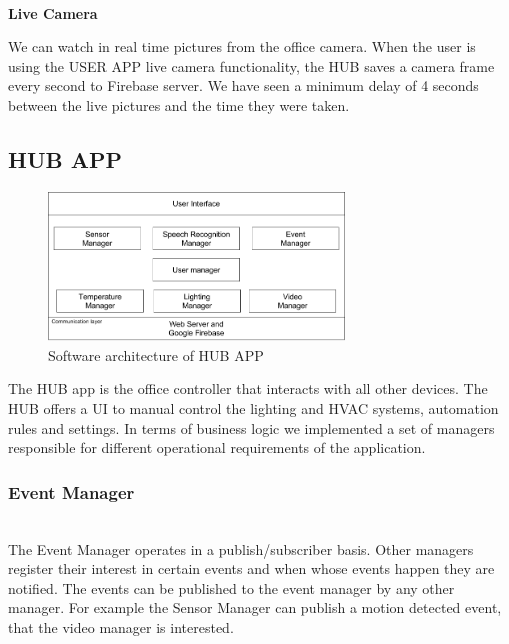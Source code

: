 \mbox{}\\
\textbf{Live Camera}

We can watch in real time pictures from the office camera. When the user is using the USER APP live camera functionality, the HUB saves a camera frame every second to Firebase server. We have seen a minimum delay of 4 seconds between the  live pictures and the time they were taken.













\subsection{HUB APP}

\begin{figure}[h]
\centering
\includegraphics[width=0.7\textwidth]{Figures/software_implementation}
\caption{Software architecture of HUB APP}
\label{software_imp}
\end{figure}


The HUB app is the office controller that interacts with all other devices. The HUB offers a \ac{UI} to manual control the lighting and \ac{HVAC} systems, automation rules and settings. In terms of business logic we implemented a set of managers responsible for different operational requirements of the application.


\subsubsection{Event Manager}\mbox{}\\

The Event Manager  operates in a publish/subscriber basis. Other managers register their interest in certain events and when whose events happen they are notified. The events can be published to the event manager by any other manager. For example the Sensor Manager can publish a motion detected event, that the video manager is interested.

